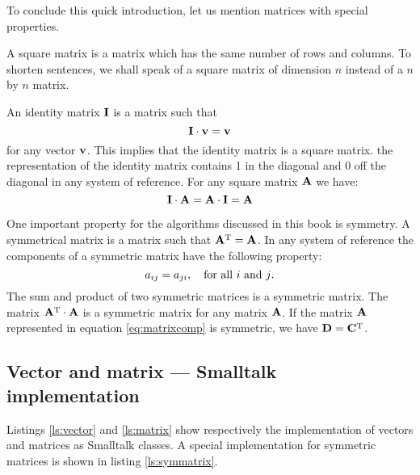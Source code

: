 \documentclass[twoside]{book}
\begin{document}
To conclude this quick introduction, let us mention matrices with
special properties.

A square matrix is a matrix which has the same number of rows and
columns. To shorten sentences, we shall speak of a square matrix
of dimension $n$ instead of a $n$ by $n$ matrix.

An identity matrix ${\bf I}$ is a matrix such that
\begin{equation}
  {\bf I}\cdot{\bf v}={\bf v}
\end{equation}
for any vector ${\bf v}$. This implies that the identity matrix is
a square matrix. the representation of the identity matrix
contains 1 in the diagonal and 0 off the diagonal in any system of
reference. For any square matrix ${\bf A}$ we have:
\begin{equation}
  {\bf I}\cdot{\bf A}={\bf A}\cdot{\bf I}={\bf A}
\end{equation}

One important property for the algorithms discussed in this book
is symmetry. A symmetrical matrix is a matrix such that ${\bf
A}^{\mathop{\rm T}}={\bf A}$. In any system of reference the
components of a symmetric matrix have the following property:
\begin{equation}
  a_{ij}=a_{ji}, \mbox{\quad for all $i$ and $j$.}
\end{equation}
The sum and product of two symmetric matrices is a symmetric
matrix. The matrix ${\bf A}^{\mathop{\rm T}}\cdot{\bf A}$ is a
symmetric matrix for any matrix ${\bf A}$. If the matrix ${\bf A}$
represented in equation \ref{eq:matrixcomp} is symmetric, we have
${\bf D}={\bf C}^{\mathop{\rm T}}$.

\subsection{Vector and matrix --- Smalltalk  implementation}
\label{sec:slinearalgebra}  Listings \ref{ls:vector} and \ref{ls:matrix} show
respectively the implementation of vectors and matrices as
Smalltalk classes. A special implementation for symmetric matrices
is shown in listing \ref{ls:symmatrix}.
\end{document}
